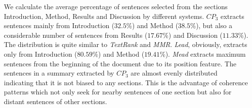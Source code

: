 We calculate the average percentage of sentences selected from the sections Introduction, Method, Results and Discussion by different systems.  \emph{$CP_3$} extracts sentences mainly from Introduction ($32.5$\%) and Method ($38.5$\%), but also a considerable number of sentences from Results ($17.67$\%) and Discussion ($11.33$\%). The distribution is quite similar to \emph{TextRank} and \emph{MMR}. \emph{Lead}, obviously, extracts only from Introduction ($80.59$\%) and Method ($19.41$\%). \emph{Mead} extracts maximum sentences from the beginning of the document due to its position feature. The sentences in a summary extracted by \emph{$CP_3$} are almost evenly distributed indicating that it is not biased to any sections. This is the advantage of coherence patterns which not only seek for nearby sentences of one section but also for distant sentences of other sections.


